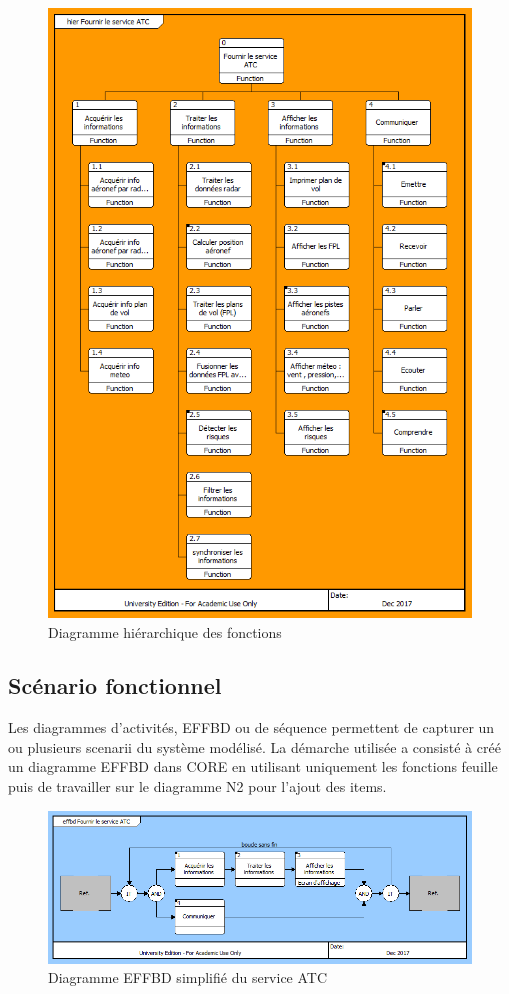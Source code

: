 	\begin{figure}[H]
		\begin{center}	
			\includegraphics[scale=0.85]{images/hierarchique}
			\caption{Diagramme hiérarchique des fonctions}
			\label{hier}
		\end{center}
	\end{figure}
	
	\subsection{Scénario fonctionnel}

    Les diagrammes d'activités, EFFBD ou de séquence permettent de capturer un ou plusieurs scenarii du système modélisé. La démarche utilisée a consisté à créé un diagramme EFFBD dans CORE en utilisant uniquement les fonctions feuille puis de travailler sur le diagramme N2 pour l'ajout des items.
    
    	\begin{figure}[H]
    	\begin{center}	
    		\includegraphics[scale=0.75]{images/atc}
    		\caption{Diagramme EFFBD simplifié du service ATC}
    		\label{atc}
    	\end{center}
    \end{figure}
    